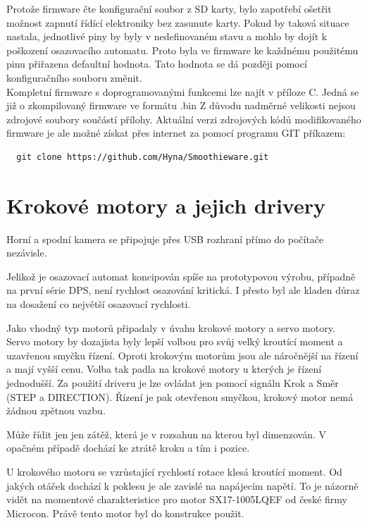 Protože firmware čte konfigurační soubor z SD karty, bylo zapotřebí ošetřit možnost zapnutí řídící elektroniky bez zasunute karty. Pokud by taková situace nastala, jednotlivé piny by byly v nedefinovaném stavu a mohlo by dojít k poškození osazovacího automatu. Proto byla ve firmware ke každnému použitému pinu přiřazena defaultní hodnota. Tato hodnota se dá později pomocí konfiguračního souboru změnit.
\\

Kompletní firmware s doprogramovanými funkcemi lze najít v příloze C. Jedná se již o zkompilovaný firmware ve formátu .bin  Z důvodu nadměrné velikosti nejsou zdrojové soubory součástí přílohy. Aktuální verzi zdrojových kódů modifikovaného firmware je ale možné získat přes internet za pomocí programu GIT příkazem:
\begin{verbatim}
  git clone https://github.com/Hyna/Smoothieware.git
\end{verbatim}
	




\section{Krokové motory a jejich drivery}

Horní a spodní kamera se připojuje přes USB rozhraní přímo do počítače nezávisle.

Jelikož je osazovací automat koncipován spíše na prototypovou výrobu, případně na první série DPS, není rychlost osazování kritická. I přesto byl ale kladen důraz na dosažení co největší osazovací rychlosti.

Jako vhodný typ motorů připadaly v úvahu krokové motory a servo motory. Servo motory by dozajista byly lepší volbou pro svůj velký kroutící moment a uzavřenou smyčku řízení. Oproti krokovým motorům jsou ale náročnější na řízení a mají vyšší cenu.
Volba tak padla na krokové motory u kterých je řízení jednodušší. Za použití driveru je lze ovládat jen pomocí signálu Krok a Směr (STEP a DIRECTION). Řízení je pak otevřenou smyčkou, krokový motor nemá žádnou zpětnou vazbu.

Může řídit jen jen zátěž, která je v rozsahun na kterou byl dimenzován. V opačném případě dochází ke ztrátě kroku a tím i pozice.

U krokového motoru se vzrůstající rychlostí rotace klesá kroutící moment. Od jakých otáček dochází k poklesu je ale zavislé na napájecím napětí. To je názorně vidět na momentové charakteristice pro motor SX17-1005LQEF od české firmy Microcon. Právě tento motor byl do konstrukce použit.


